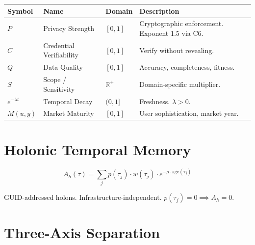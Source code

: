 \documentclass[
]{article}
\newcounter{none} %
\begin{document}
{\def\LTcaptype{none} %
\begin{longtable}[]{@{}
  >{\raggedright\arraybackslash}p{}
  >{\raggedright\arraybackslash}p{}
  >{\raggedright\arraybackslash}p{}
  >{\raggedright\arraybackslash}p{}@{}}
\toprule\noalign{}
\begin{minipage}[b]{\linewidth}\raggedright
Symbol
\end{minipage} & \begin{minipage}[b]{\linewidth}\raggedright
Name
\end{minipage} & \begin{minipage}[b]{\linewidth}\raggedright
Domain
\end{minipage} & \begin{minipage}[b]{\linewidth}\raggedright
Description
\end{minipage} \\
\midrule\noalign{}
\endhead
\bottomrule\noalign{}
\endlastfoot
\(P\) & Privacy Strength & \([0,1]\) & Cryptographic enforcement.
Exponent 1.5 via C6. \\
\(C\) & Credential Verifiability & \([0,1]\) & Verify without
revealing. \\
\(Q\) & Data Quality & \([0,1]\) & Accuracy, completeness, fitness. \\
\(S\) & Scope / Sensitivity & \(\mathbb{R}^+\) & Domain-specific
multiplier. \\
\(e^{-\lambda t}\) & Temporal Decay & \((0,1]\) & Freshness.
\(\lambda > 0\). \\
\(M(u,y)\) & Market Maturity & \([0,1]\) & User sophistication, market
year. \\
\end{longtable}
}

\section{Holonic Temporal Memory}\label{holonic-temporal-memory}

\[A_h(\tau) = \sum_j p(\tau_j) \cdot w(\tau_j) \cdot e^{-\mu \cdot \text{age}(\tau_j)}\]

GUID-addressed holons. Infrastructure-independent.
\(p(\tau_j) = 0 \implies A_h = 0\).

\section{Three-Axis Separation}\label{three-axis-separation}
\end{document}
